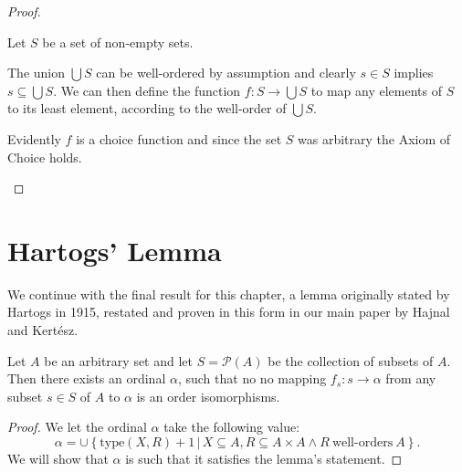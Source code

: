 \documentclass[../../main.tex]{subfiles}
\begin{document}
\begin{proof}
\begin{enumerate}
        Let $S$ be a set of non-empty sets.

        The union $\bigcup S$ can be well-ordered by assumption and clearly $s \in S$ implies $s \subseteq \bigcup S$.
        We can then define the function $f: S \to \bigcup S$ to map any elements of $S$ to its least element, according to the well-order of $\bigcup S$.
        
        Evidently $f$ is a choice function and since the set $S$ was arbitrary the Axiom of Choice holds. \qedhere
    \end{enumerate}
\end{proof}

\section{Hartogs' Lemma}
We continue with the final result for this chapter, 
a lemma originally stated by Hartogs in 1915, restated and proven in this form in our main paper by Hajnal and Kertész.

\begin{lemma}\cite{Har15}
    Let $A$ be an arbitrary set and let $S = \mathcal{P}(A)$ be the collection of subsets of $A$.
    Then there exists an ordinal $\alpha$, such that no no mapping $f_s: s \to \alpha$ from any subset $s \in S$ of $A$ to $\alpha$ is an order isomorphisms.
\end{lemma}

\begin{proof}\cite[Lemma]{Haj72}
    We let the ordinal $\alpha$ take the following value:
    $$\alpha = \cup\left\{ \text{type}\left(X, R\right) + 1 \,\vert\, X \subseteq A, R \subseteq A \times A \wedge R\ \text{well-orders}\ A\right\}.$$
    We will show that $\alpha$ is such that it satisfies the lemma's statement.

\end{proof}
\end{document}
